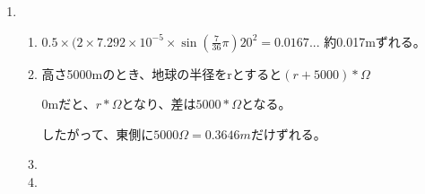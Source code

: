 \documentclass{jsarticle}
\newenvironment{problems}
{
  \renewcommand\labelenumi{\doublebox{\arabic{enumi}}}
  \begin{enumerate}
}{
  \end{enumerate}
  \renewcommand\labelenumi{\arabic{enumi}.}
}
\begin{document}
\begin{problems}
\item 
	\begin{enumerate}[(1)]
        \item 
        $0.5 \times (2\times7.292 \times 10^{-5} \times\sin(\frac{7}{36}\pi) 20^2 = 0.0167... $
        約0.017mずれる。
        \item
        高さ5000mのとき、地球の半径をrとすると$(r+5000)*\Omega$

        0mだと、$r*\Omega$となり、差は$5000*\Omega$となる。
        
        したがって、東側に$5000\Omega = 0.3646m$だけずれる。
        \item

        \item
    \end{enumerate}
\end{problems}
\end{document}
